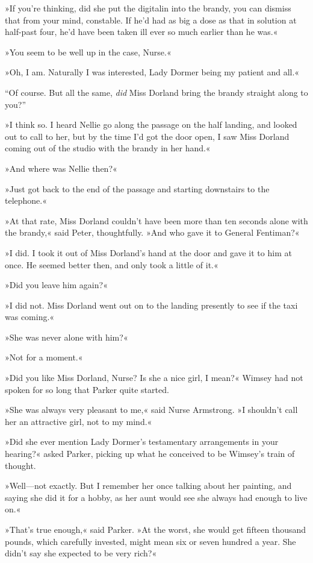 »If you're thinking, did she put the digitalin into the brandy, you can dismiss that from your mind, constable. If he'd had as big a dose as that in solution at half-past four, he'd have been taken ill ever so much earlier than he was.«

»You seem to be well up in the case, Nurse.«

»Oh, I am. Naturally I was interested, Lady Dormer being my patient and all.«

\enquote{Of course. But all the same, \textit{did} Miss Dorland bring the brandy straight along to you?}

»I think so. I heard Nellie go along the passage on the half landing, and looked out to call to her, but by the time I'd got the door open, I saw Miss Dorland coming out of the studio with the brandy in her hand.«

»And where was Nellie then?«

»Just got back to the end of the passage and starting downstairs to the telephone.«

»At that rate, Miss Dorland couldn't have been more than ten seconds alone with the brandy,« said Peter, thoughtfully. »And who gave it to General Fentiman?«

»I did. I took it out of Miss Dorland's hand at the door and gave it to him at once. He seemed better then, and only took a little of it.«

»Did you leave him again?«

»I did not. Miss Dorland went out on to the landing presently to see if the taxi was coming.«

»She was never alone with him?«

»Not for a moment.«

»Did you like Miss Dorland, Nurse? Is she a nice girl, I mean?« Wimsey had not spoken for so long that Parker quite started.

»She was always very pleasant to me,« said Nurse Armstrong. »I shouldn't call her an attractive girl, not to my mind.«

»Did she ever mention Lady Dormer's testamentary arrangements in your hearing?« asked Parker, picking up what he conceived to be Wimsey's train of thought.

»Well\allowbreak---\allowbreak not exactly. But I remember her once talking about her painting, and saying she did it for a hobby, as her aunt would see she always had enough to live on.«

»That's true enough,« said Parker. »At the worst, she would get fifteen thousand pounds, which carefully invested, might mean six or seven hundred a year. She didn't say she expected to be very rich?«

